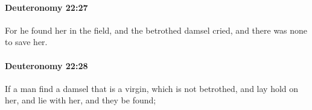 		\paragraph{Deuteronomy 22:27} %
			\label{DEUTERONOMY-22-27}

			For he found her in the field, and the betrothed damsel cried, and there was none to save her.


		\paragraph{Deuteronomy 22:28} %
			\label{DEUTERONOMY-22-28}

			If a man find a damsel that is a virgin, which is not betrothed, and lay hold on her, and lie with her, and they be found;


